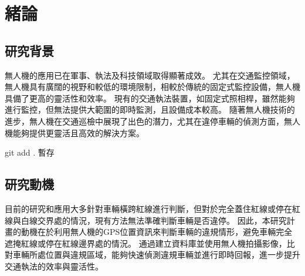 \documentclass[12pt]{article}       %
\begin{document}
\newpage  %


\begin{center}
\tableofcontents  %
\thispagestyle{empty}  %
\end{center}
\newpage  %


\setcounter{page}{1}  %


\section{\centering 緒論}

\subsection{研究背景} 
\hspace{2em}無人機的應用已在軍事、執法及科技領域取得顯著成效。
尤其在交通監控領域，無人機具有廣闊的視野和較低的環境限制，相較於傳統的固定式監控設備，無人機具備了更高的靈活性和效率。
現有的交通執法裝置，如固定式照相桿，雖然能夠進行監控，但無法提供大範圍的即時監測，且設備成本較高。
隨著無人機技術的進步，無人機在交通巡檢中展現了出色的潛力，尤其在違停車輛的偵測方面，無人機能夠提供更靈活且高效的解決方案。

git add .		暫存
\subsection{研究動機} 
\hspace{2em}目前的研究和應用大多針對車輛橫跨紅線進行判斷，但對於完全蓋住紅線或停在紅線與白線交界處的情況，現有方法無法準確判斷車輛是否違停。
因此，本研究計畫的動機在於利用無人機的GPS位置資訊來判斷車輛的違規情形，避免車輛完全遮掩紅線或停在紅線邊界處的情況。
通過建立資料庫並使用無人機拍攝影像，比對車輛所處位置與違規區域，能夠快速偵測違規車輛並進行即時回報，進一步提升交通執法的效率與靈活性。
\end{document}
